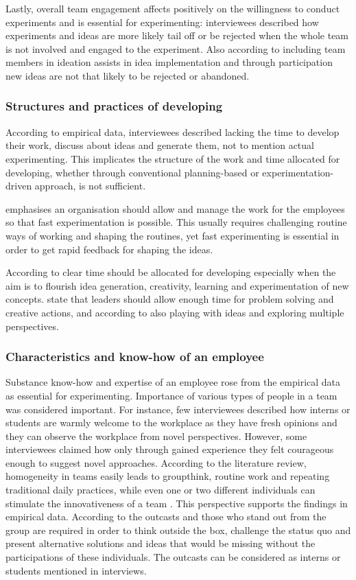 Lastly, overall team engagement affects positively on the willingness to conduct experiments and is essential for experimenting: interviewees described how experiments and ideas are more likely tail off or be rejected when the whole team is not involved and engaged to the experiment. Also according to \citet{agrell1994team} including team members in ideation assists in idea implementation and through participation new ideas are not that likely to be rejected or abandoned.

\subsubsection*{Structures and practices of developing}
According to empirical data, interviewees described lacking the time to develop their work, discuss about ideas and generate them, not to mention actual experimenting. This implicates the structure of the work and time allocated for developing, whether through conventional planning-based or experimentation-driven approach, is not sufficient. 

\citet{thomke2001enlightened} emphasises an organisation should allow and manage the work for the employees so that fast experimentation is possible. This usually requires challenging routine ways of working and shaping the routines, yet fast experimenting is essential in order to get rapid feedback for shaping the ideas.

According to \citet{amabile2002creativity} clear time should be allocated for developing especially when the aim is to flourish idea generation, creativity, learning and experimentation of new concepts. \citet{redmond1993putting} state that leaders should allow enough time for problem solving and creative actions, and according to \citet{amabile1987creativity} also playing with ideas and exploring multiple perspectives.

\subsubsection*{Characteristics and know-how of an employee}
Substance know-how and expertise of an employee rose from the empirical data as essential for experimenting. Importance of various types of people in a team was considered important. For instance, few interviewees described how interns or students are warmly welcome to the workplace as they have fresh opinions and they can observe the workplace from novel perspectives. However, some interviewees claimed how only through gained experience they felt courageous enough to suggest novel approaches. According to the literature review, homogeneity in teams easily leads to groupthink, routine work and repeating traditional daily practices, while even one or two different individuals can stimulate the innovativeness of a team \citep{sternberg1997creativity}. This perspective supports the findings in empirical data. According to \citet{sternberg1997creativity} the outcasts and those who stand out from the group are required in order to think outside the box, challenge the status quo and present alternative solutions and ideas that would be missing without the participations of these individuals. The outcasts can be considered as interns or students mentioned in interviews.

